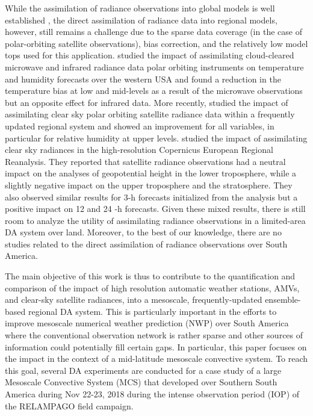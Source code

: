 \documentclass[preprint, 3p, authoryear,review, 12pt]{elsarticle} %
\begin{document}
While the assimilation of radiance observations into global models is well established \citep{eyre2020}, the direct assimilation of radiance data into regional models, however, still remains a challenge due to the sparse data coverage (in the case of polar-orbiting satellite observations), bias correction, and the relatively low model tops used for this application. \citet{bao2015} studied the impact of assimilating cloud-cleared microwave and infrared radiance data polar orbiting instruments on temperature and humidity forecasts over the western USA and found a reduction in the temperature bias at low and mid-levels as a result of the microwave observations but an opposite effect for infrared data. More recently, \citet{zhu2019} studied the impact of assimilating clear sky polar orbiting satellite radiance data within a frequently updated regional system and showed an improvement for all variables, in particular for relative humidity at upper levels. \citet{wang2021} studied the impact of assimilating clear sky radiances in the high-resolution Copernicus European Regional Reanalysis. They reported that satellite radiance observations had a neutral impact on the analyses of geopotential height in the lower troposphere, while a slightly negative impact on the upper troposphere and the stratosphere. They also observed similar results for 3-h forecasts initialized from the analysis but a positive impact on 12 and 24 -h forecasts. Given these mixed results, there is still room to analyze the utility of assimilating radiance observations in a limited-area DA system over land. Moreover, to the best of our knowledge, there are no studies related to the direct assimilation of radiance observations over South America.

The main objective of this work is thus to contribute to the quantification and comparison of the impact of high resolution automatic weather stations, AMVs, and clear-sky satellite radiances, into a mesoscale, frequently-updated ensemble-based regional DA system. This is particularly important in the efforts to improve mesoscale numerical weather prediction (NWP) over South America where the conventional observation network is rather sparse and other sources of information could potentially fill certain gaps. In particular, this paper focuses on the impact in the context of a mid-latitude mesoscale convective system. To reach this goal, several DA experiments are conducted for a case study of a large Mesoscale Convective System (MCS) that developed over Southern South America during Nov 22-23, 2018 during the intense observation period (IOP) of the RELAMPAGO field campaign.
\end{document}
